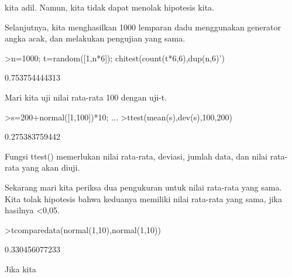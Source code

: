 \documentclass[a4paper,10pt]{article}
\begin{document}
\begin{eulernotebook}
\begin{eulercomment}
\begin{eulercomment}
\begin{eulercomment}
\begin{eulercomment}
\begin{eulercomment}
\begin{eulercomment}
\begin{eulercomment}
\begin{eulercomment}
\begin{eulercomment}
\begin{eulercomment}
\begin{eulercomment}
\begin{eulercomment}
\begin{eulercomment}
\begin{eulercomment}
\begin{eulercomment}
\begin{eulercomment}
\begin{eulercomment}
\begin{eulercomment}
\begin{eulercomment}
\begin{eulercomment}
\begin{eulercomment}
\begin{eulercomment}
\begin{eulercomment}
\begin{eulercomment}
\begin{eulercomment}
\begin{eulercomment}
\begin{eulercomment}
\begin{eulercomment}
\begin{eulercomment}
\begin{eulercomment}
\begin{eulercomment}
\begin{eulercomment}
\begin{eulercomment}
\begin{eulercomment}
\begin{eulercomment}
\begin{eulercomment}
\begin{eulercomment}
\begin{eulercomment}
\begin{eulercomment}
\begin{eulercomment}
\begin{eulercomment}
\begin{eulercomment}
\begin{eulercomment}
\begin{eulercomment}
\begin{eulercomment}
\begin{eulercomment}
\begin{eulercomment}
\begin{eulercomment}
\begin{eulercomment}
\begin{eulercomment}
\begin{eulercomment}
\begin{eulercomment}
\begin{eulercomment}
\begin{eulercomment}
\begin{eulercomment}
\begin{eulercomment}
\begin{eulercomment}
\begin{eulercomment}
\begin{eulercomment}
\begin{eulercomment}
\begin{eulercomment}
\begin{eulercomment}
\begin{eulercomment}
\begin{eulercomment}
\begin{eulercomment}
\begin{eulercomment}
\begin{eulercomment}
kita adil. Namun, kita tidak
dapat menolak hipotesis kita.

Selanjutnya, kita menghasilkan 1000 lemparan dadu menggunakan
generator angka acak, dan melakukan pengujian yang sama.
\end{eulercomment}
\begin{eulerprompt}
>n=1000; t=random([1,n*6]); chitest(count(t*6,6),dup(n,6)')
\end{eulerprompt}
\begin{euleroutput}
  0.753754444313
\end{euleroutput}
\begin{eulercomment}
Mari kita uji nilai rata-rata 100 dengan uji-t.
\end{eulercomment}
\begin{eulerprompt}
>s=200+normal([1,100])*10; ...
>ttest(mean(s),dev(s),100,200)
\end{eulerprompt}
\begin{euleroutput}
  0.275383759442
\end{euleroutput}
\begin{eulercomment}
Fungsi ttest() memerlukan nilai rata-rata, deviasi, jumlah data, dan
nilai rata-rata yang akan diuji.

Sekarang mari kita periksa dua pengukuran untuk nilai rata-rata yang
sama. Kita tolak hipotesis bahwa keduanya memiliki nilai rata-rata
yang sama, jika hasilnya \textless{}0,05.
\end{eulercomment}
\begin{eulerprompt}
>tcomparedata(normal(1,10),normal(1,10))
\end{eulerprompt}
\begin{euleroutput}
  0.330456077233
\end{euleroutput}
\begin{eulercomment}
Jika kita 
\end{eulercomment}
\end{eulercomment}
\end{eulercomment}
\end{eulercomment}
\end{eulercomment}
\end{eulercomment}
\end{eulercomment}
\end{eulercomment}
\end{eulercomment}
\end{eulercomment}
\end{eulercomment}
\end{eulercomment}
\end{eulercomment}
\end{eulercomment}
\end{eulercomment}
\end{eulercomment}
\end{eulercomment}
\end{eulercomment}
\end{eulercomment}
\end{eulercomment}
\end{eulercomment}
\end{eulercomment}
\end{eulercomment}
\end{eulercomment}
\end{eulercomment}
\end{eulercomment}
\end{eulercomment}
\end{eulercomment}
\end{eulercomment}
\end{eulercomment}
\end{eulercomment}
\end{eulercomment}
\end{eulercomment}
\end{eulercomment}
\end{eulercomment}
\end{eulercomment}
\end{eulercomment}
\end{eulercomment}
\end{eulercomment}
\end{eulercomment}
\end{eulercomment}
\end{eulercomment}
\end{eulercomment}
\end{eulercomment}
\end{eulercomment}
\end{eulercomment}
\end{eulercomment}
\end{eulercomment}
\end{eulercomment}
\end{eulercomment}
\end{eulercomment}
\end{eulercomment}
\end{eulercomment}
\end{eulercomment}
\end{eulercomment}
\end{eulercomment}
\end{eulercomment}
\end{eulercomment}
\end{eulercomment}
\end{eulercomment}
\end{eulercomment}
\end{eulercomment}
\end{eulercomment}
\end{eulercomment}
\end{eulercomment}
\end{eulercomment}
\end{eulercomment}
\end{eulernotebook}
\end{document}
